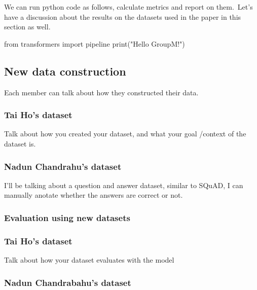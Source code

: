 \documentclass[
  11pt,
]{article}
\newenvironment{Shaded}{\begin{snugshade}}{\end{snugshade}}
\newcommand{\BuiltInTok}[1]{#1}
\newcommand{\ImportTok}[1]{#1}
\newcommand{\NormalTok}[1]{#1}
\newcommand{\StringTok}[1]{\textcolor[rgb]{0.31,0.60,0.02}{#1}}
\begin{document}
We can run python code as follows, calculate metrics and report on
them.~Let's have a discussion about the results on the datasets used in
the paper in this section as well.

\begin{Shaded}
\begin{Highlighting}[]
\ImportTok{from}\NormalTok{ transformers }\ImportTok{import}\NormalTok{ pipeline}
\BuiltInTok{print}\NormalTok{(}\StringTok{"Hello GroupM!"}\NormalTok{)}
\end{Highlighting}
\end{Shaded}

\subsection{New data construction}\label{new-data-construction}

Each member can talk about how they constructed their data.

\subsubsection{Tai Ho's dataset}\label{tai-hos-dataset}

Talk about how you created your dataset, and what your goal /context of
the dataset is.

\subsubsection{Nadun Chandrahu's
dataset}\label{nadun-chandrahus-dataset}

I'll be talking about a question and answer dataset, similar to SQuAD, I
can manually anotate whether the answers are correct or not.

\subsubsection{Evaluation using new
datasets}\label{evaluation-using-new-datasets}

\subsubsection{Tai Ho's dataset}\label{tai-hos-dataset-1}

Talk about how your dataset evaluates with the model

\subsubsection{Nadun Chandrabahu's
dataset}\label{nadun-chandrabahus-dataset}
\end{document}
